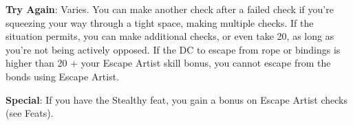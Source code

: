 \textbf{Try Again}: Varies. You can make another check after a failed check if you're squeezing your way through a tight space, making multiple checks. If the situation permits, you can make additional checks, or even take 20, as long as you're not being actively opposed. If the DC to escape from rope or bindings is higher than 20 + your Escape Artist skill bonus, you cannot escape from the bonds using Escape Artist.
				
\textbf{Special}: If you have the Stealthy feat, you gain a bonus on Escape Artist checks (see Feats).
        	